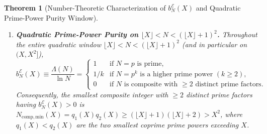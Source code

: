 \documentclass[11pt,reqno]{amsart}
\newtheorem{theorem}{Theorem}[section]
\theoremstyle{definition}
\theoremstyle{remark}
\numberwithin{equation}{section}
\begin{document}
\begin{theorem}[Number-Theoretic Characterization of $b_N^{\mathcal{E}}(X)$ and Quadratic Prime-Power Purity Window]
\begin{enumerate}[label=\textup{(\roman*)},leftmargin=2.2em]
\begin{equation}
\end{equation}
\item \textbf{Quadratic Prime-Power Purity on $\lfloor X\rfloor < N < (\lfloor X\rfloor + 1)^2$.} Throughout the entire quadratic window $\lfloor X\rfloor < N < (\lfloor X\rfloor + 1)^2$ (and in particular on $(X, X^2]$),
\begin{equation}\label{eq:quadratic_purity_law}
b_N^{\mathcal{E}}(X) \equiv \frac{\Lambda(N)}{\ln N} = \begin{cases}
1 & \text{if } N = p \text{ is prime}, \\
1/k & \text{if } N = p^k \text{ is a higher prime power } (k \ge 2), \\
0 & \text{if } N \text{ is composite with } \ge 2 \text{ distinct prime factors}.
\end{cases}
\end{equation}
Consequently, the smallest composite integer with $\ge 2$ distinct prime factors having $b_N^{\mathcal{E}}(X) > 0$ is $N_{\mathrm{comp,min}}(X) = q_1(X)q_2(X) \ge (\lfloor X\rfloor + 1)(\lfloor X\rfloor + 2) > X^2$, where $q_1(X) < q_2(X)$ are the two smallest coprime prime powers exceeding $X$.
\end{enumerate}
\end{theorem}
\end{document}
